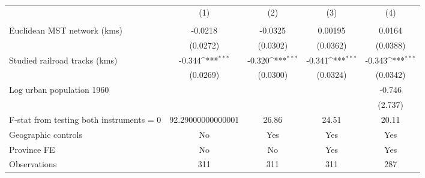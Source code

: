 {
\def\sym#1{\ifmmode^{#1}\else\(^{#1}\)\fi}
\begin{tabular}{l*{4}{c}}
\hline\hline
                &\multicolumn{1}{c}{(1)}&\multicolumn{1}{c}{(2)}&\multicolumn{1}{c}{(3)}&\multicolumn{1}{c}{(4)}\\
                &\multicolumn{1}{c}{}&\multicolumn{1}{c}{}&\multicolumn{1}{c}{}&\multicolumn{1}{c}{}\\
\hline
Euclidean MST network (kms)&  -0.0218         &  -0.0325         &  0.00195         &   0.0164         \\
                & (0.0272)         & (0.0302)         & (0.0362)         & (0.0388)         \\
[1em]
Studied railroad tracks (kms)&   -0.344\sym{***}&   -0.320\sym{***}&   -0.341\sym{***}&   -0.343\sym{***}\\
                & (0.0269)         & (0.0300)         & (0.0324)         & (0.0342)         \\
[1em]
Log urban population 1960&                  &                  &                  &   -0.746         \\
                &                  &                  &                  &  (2.737)         \\
\hline
F-stat from testing both instruments = 0&92.29000000000001         &    26.86         &    24.51         &    20.11         \\
Geographic controls&       No         &      Yes         &      Yes         &      Yes         \\
Province FE     &       No         &       No         &      Yes         &      Yes         \\
Observations    &      311         &      311         &      311         &      287         \\
\hline\hline
\end{tabular}
}
